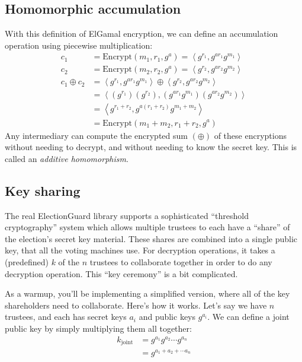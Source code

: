 \subsection{Homomorphic accumulation}
With this definition of ElGamal encryption, we can define an
accumulation operation using piecewise multiplication:
\begin{align*}
c_1 &= \mathrm{Encrypt}(m_1, r_1, g^a) = \left<g^{r_1}, g^{a{r_1}}g^{m_1}\right>\\
c_2 &= \mathrm{Encrypt}(m_2, r_2, g^a) = \left<g^{r_2}, g^{a{r_2}}g^{m_2}\right>\\
c_1 \oplus c_2 &= \left<g^{r_1}, g^{a{r_1}}g^{m_1}\right> \oplus \left<g^{r_2}, g^{a{r_2}}g^{m_2}\right>  \\
&= \left<\left(g^{r_1}\right)\left(g^{r_2}\right), \left(g^{a{r_1}}g^{m_1}\right)\left(g^{a{r_2}}g^{m_2}\right)\right> \\
&= \left<g^{r_1 + r_2}, g^{a(r_1 + r_2)}g^{m_1 + m_2}\right>\\
&= \mathrm{Encrypt}(m_1 + m_2, r_1 + r_2, g^a)
\end{align*}
Any intermediary can compute the encrypted sum $(\oplus)$ of these encryptions
without needing to decrypt, and without needing to know the secret
key. This is called an {\em additive homomorphism}.

\subsection{Key sharing}
\label{sec:keyshare}

The real ElectionGuard library supports a sophisticated ``threshold
cryptography'' system
which allows multiple trustees to each have a ``share'' of the
election's secret key material. These shares are combined into a single
public key, that all the voting machines use. For decryption
operations, it takes a (predefined) $k$ of the $n$ trustees to
collaborate together in order to do any decryption operation.
This ``key ceremony'' is a bit complicated.

As a warmup, you'll be implementing a simplified version, where
all of the key shareholders need to collaborate. Here's how it
works. Let's say we have $n$ trustees, and each has secret keys $a_i$
and public keys $g^{a_i}$. We can define a joint public key by
simply multiplying them all together:
\begin{align*}
k_{\mathrm{joint}}&= g^{a_1}g^{a_2} \cdots g^{a_n}\\
&= g^{a_1 + a_2 + \cdots a_n}
\end{align*}
                                                                 
